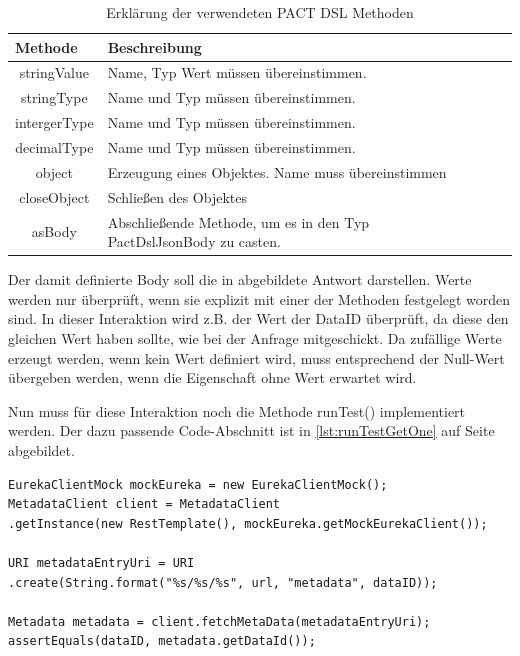 \documentclass{llncs}
\begin{document}
\begin{table}[htbp]
\centering
\begin{tabular}{|c|l|p{4cm}|p{4cm}|}
\hline
\multicolumn{1}{|l|}{Methode} & Beschreibung \\ \hline
stringValue & Name, Typ Wert müssen übereinstimmen. \\ \hline
stringType & Name und Typ müssen übereinstimmen. \\ \hline
intergerType & Name und Typ müssen übereinstimmen. \\ \hline
decimalType & Name und Typ müssen übereinstimmen. \\ \hline
object & Erzeugung eines Objektes. Name muss übereinstimmen  \\ \hline
closeObject & Schließen des Objektes\\ \hline
asBody & Abschließende Methode, um es in den Typ PactDslJsonBody zu casten. \\ \hline
\end{tabular}
\caption{Erklärung der verwendeten PACT DSL Methoden}
\label{tab:Methoden_jsonBody}
\end{table}

Der damit definierte Body soll die in abgebildete Antwort darstellen. Werte werden nur überprüft, wenn sie explizit mit einer der Methoden festgelegt worden sind. In dieser Interaktion wird z.B. der Wert der DataID überprüft, da diese den gleichen Wert haben sollte, wie bei der Anfrage mitgeschickt. Da zufällige Werte erzeugt werden, wenn kein Wert definiert wird, muss entsprechend der Null-Wert übergeben werden, wenn die Eigenschaft ohne Wert erwartet wird.

Nun muss für diese Interaktion noch die Methode runTest() implementiert werden. Der dazu passende Code-Abschnitt ist in \ref{lst:runTestGetOne} auf Seite \pageref{lst:runTestGetOne} abgebildet.

\lstset{language = Java}
\begin{lstlisting}[caption=runTest() für die GET-Methode,label={lst:runTestGetOne}]
EurekaClientMock mockEureka = new EurekaClientMock();
MetadataClient client = MetadataClient
.getInstance(new RestTemplate(), mockEureka.getMockEurekaClient());

URI metadataEntryUri = URI
.create(String.format("%s/%s/%s", url, "metadata", dataID));

Metadata metadata = client.fetchMetaData(metadataEntryUri);
assertEquals(dataID, metadata.getDataId());
\end{lstlisting}
 
\end{document}
